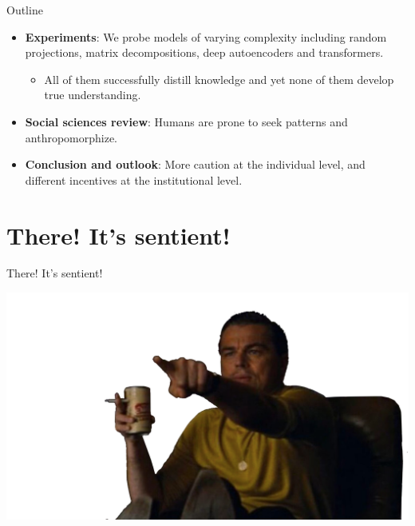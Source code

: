 \documentclass[
  10pt,
  ignorenonframetext,
  aspectratio=169,
  notheorems]{beamer}
\providecommand{\tightlist}{%
  \setlength{\itemsep}{0pt}\setlength{\parskip}{0pt}}\usepackage{longtable,booktabs,array}
\begin{document}
\begin{frame}{Outline}
\label{outline}
\begin{itemize}[<+->]
\tightlist
\item
  \textbf{Experiments}: We probe models of varying complexity including
  random projections, matrix decompositions, deep autoencoders and
  transformers.

  \begin{itemize}[<+->]
  \tightlist
  \item
    All of them successfully distill knowledge and yet none of them
    develop true understanding.
  \end{itemize}
\item
  \textbf{Social sciences review}: Humans are prone to seek patterns and
  anthropomorphize.
\item
  \textbf{Conclusion and outlook}: More caution at the individual level,
  and different incentives at the institutional level.
\end{itemize}
\end{frame}

\section{There! It's sentient!}\label{there-its-sentient}

\begin{frame}{There! It's sentient!}
\begin{center}
\includegraphics{www/leo.png}
\end{center}
\end{frame}
\end{document}
